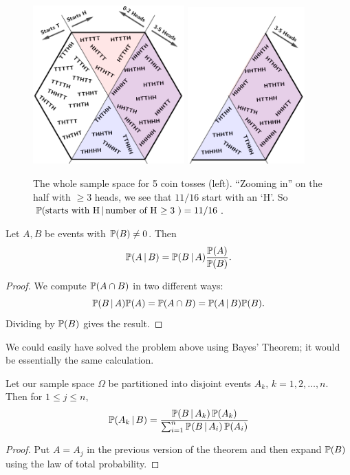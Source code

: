 \begin{figure}[h] \centering
\includegraphics[width=0.52\textwidth]{existing-materials/ProbabilityNotes_23-24/images/condo0.png}\qquad
\includegraphics[width=0.4\textwidth]{existing-materials/ProbabilityNotes_23-24/images/condo1.png}
\caption{\label{condo} The whole sample space for 5 coin tosses (left). ``Zooming in'' on the half with $\geq 3$ heads, we see that $11/16$ start with an `H'. So ${\mathbb P}(\text{starts with H} \, | \, \text{number of H $\geq 3$ }) = 11/16$.} 
\end{figure}

\begin{thm}
Let $A,B$ be events with ${\mathbb P}(B)\not= 0$. Then 
\[
    {\mathbb P}( A \, | \, B) = {\mathbb P}( B \, | \, A) \frac{{\mathbb P}(A)}{{\mathbb P}(B)}.
 \]
\end{thm}
\begin{proof}
We compute ${\mathbb P}(A \cap B)$ in two different ways: 
 \[ 
 {\mathbb P}(B \, | \, A) {\mathbb P}(A) = {\mathbb P}(A \cap B) = {\mathbb P}(A \, | \, B) {\mathbb P}(B). 
 \]
Dividing by ${\mathbb P}(B)$ gives the result. 
\end{proof}
We could easily have solved the problem above using Bayes' Theorem; it would be essentially the same calculation. 
\begin{thm}
Let our sample space $\Omega$ be partitioned into disjoint events $A_k, \, k=1,2,\dots, n$.  Then for $1\leq j \leq n$, 
\[
   {\mathbb P}(A_k \, | \, B)  =   \frac{{\mathbb P}(B \, | \, A_k)\,{\mathbb P}(A_k)}{ \sum_{i=1}^n {\mathbb P}(B \, | \, A_i) \,{\mathbb P}(A_i)}
 \]
\end{thm}
\begin{proof}
Put $A=A_j$ in the previous version of the theorem and then expand ${\mathbb P}(B)$ using the law of total probability.
\end{proof}

